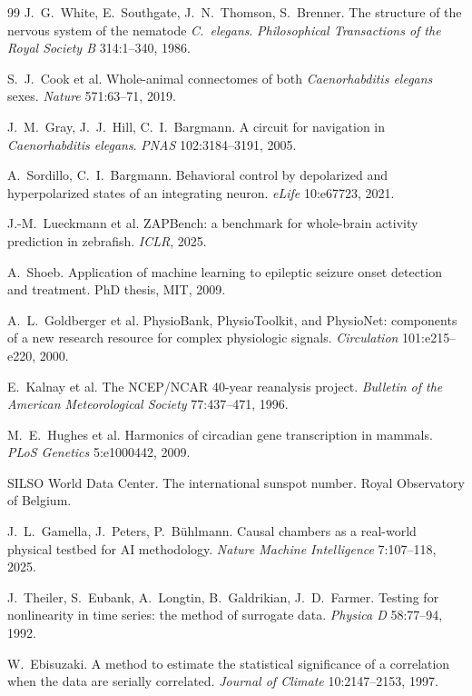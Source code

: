 \documentclass[11pt]{article}
\begin{document}
\begin{thebibliography}{99}
 J.~G.~White, E.~Southgate, J.~N.~Thomson, S.~Brenner.
The structure of the nervous system of the nematode \emph{C.~elegans}.
\emph{Philosophical Transactions of the Royal Society B} 314:1--340, 1986.

 S.~J.~Cook et al.
Whole-animal connectomes of both \emph{Caenorhabditis elegans} sexes.
\emph{Nature} 571:63--71, 2019.

 J.~M.~Gray, J.~J.~Hill, C.~I.~Bargmann.
A circuit for navigation in \emph{Caenorhabditis elegans}.
\emph{PNAS} 102:3184--3191, 2005.

 A.~Sordillo, C.~I.~Bargmann.
Behavioral control by depolarized and hyperpolarized states of an
integrating neuron. \emph{eLife} 10:e67723, 2021.

 J.-M.~Lueckmann et al.
ZAPBench: a benchmark for whole-brain activity prediction in zebrafish.
\emph{ICLR}, 2025.

 A.~Shoeb.
Application of machine learning to epileptic seizure onset detection and
treatment. PhD thesis, MIT, 2009.

 A.~L.~Goldberger et al.
PhysioBank, PhysioToolkit, and PhysioNet: components of a new research
resource for complex physiologic signals. \emph{Circulation}
101:e215--e220, 2000.

 E.~Kalnay et al.
The NCEP/NCAR 40-year reanalysis project.
\emph{Bulletin of the American Meteorological Society} 77:437--471, 1996.

 M.~E.~Hughes et al.
Harmonics of circadian gene transcription in mammals.
\emph{PLoS Genetics} 5:e1000442, 2009.

 SILSO World Data Center.
The international sunspot number. Royal Observatory of Belgium.

 J.~L.~Gamella, J.~Peters, P.~B\"uhlmann.
Causal chambers as a real-world physical testbed for AI methodology.
\emph{Nature Machine Intelligence} 7:107--118, 2025.


 J.~Theiler, S.~Eubank, A.~Longtin, B.~Galdrikian,
J.~D.~Farmer. Testing for nonlinearity in time series: the method of
surrogate data. \emph{Physica D} 58:77--94, 1992.

 W.~Ebisuzaki. A method to estimate the statistical
significance of a correlation when the data are serially correlated.
\emph{Journal of Climate} 10:2147--2153, 1997.


\end{thebibliography}
\end{document}
